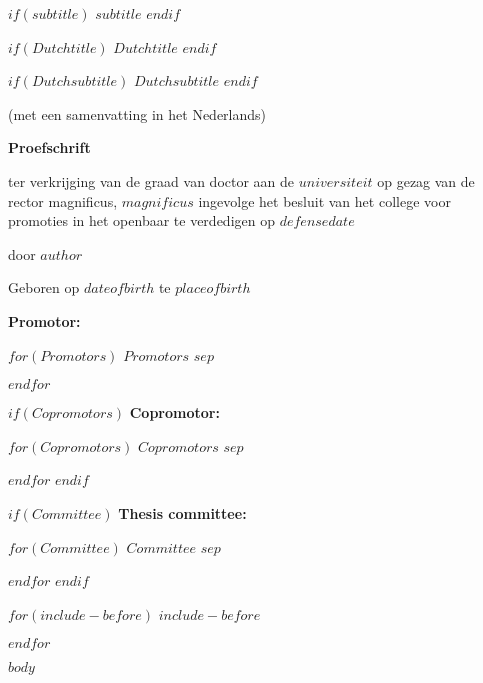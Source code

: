 \documentclass[$for(classoption)$$classoption$$sep$,$endfor$,twoside,openright]{book}
\begin{document}
\begin{titlepage}
\begin{center}
        $if(subtitle)$
        \Large
        $subtitle$
        $endif$

        $if(Dutchtitle)$
        \vspace{1cm}
        \LARGE
        $Dutchtitle$
        $endif$

        $if(Dutchsubtitle)$
        \large
        $Dutchsubtitle$
        $endif$

        (met een samenvatting in het Nederlands)

        \vfill
        \LARGE
        \textbf{Proefschrift}

        \vfill

        \large
        ter verkrijging van de graad van doctor aan de $universiteit$ op gezag van
        de rector magnificus, $magnificus$ ingevolge het besluit van het college
        voor promoties in het openbaar te verdedigen op $defensedate$

        \vfill
        door
        \vfill
        \LARGE
        \textbf{$author$}
        \vspace{.5cm}

        \normalsize
        Geboren op $dateofbirth$ te $placeofbirth$

          \vspace{.5cm}


    \end{center}
    \newpage

    \normalsize
    \begin{spacing}{0}
    \textbf{Promotor:}

    $for(Promotors)$
        \hspace{.5cm}
        $Promotors$
        $sep$

    $endfor$

    \vspace{.5cm}

    $if(Copromotors)$
        \textbf{Copromotor:}

        $for(Copromotors)$
            \hspace{.5cm}
            $Copromotors$
            $sep$

        $endfor$
    $endif$

    $if(Committee)$
        \textbf{Thesis committee:}

        $for(Committee)$
            \hspace{.5cm}
            $Committee$
            $sep$

        $endfor$
    $endif$
    \end{spacing}
\end{titlepage}

$for(include-before)$
$include-before$

$endfor$

$body$
\end{document}
